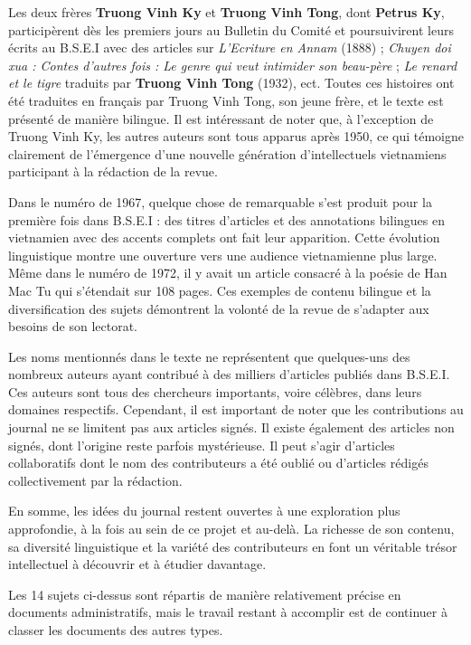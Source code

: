 Les deux frères \textbf{Truong Vinh Ky} et \textbf{Truong Vinh Tong}, dont \textbf{Petrus Ky}, participèrent dès les premiers jours au Bulletin du Comité et poursuivirent leurs écrits au B.S.E.I avec des articles sur \textit{L'Ecriture en Annam} (1888) ; \textit{Chuyen doi xua : Contes d'autres fois : Le genre qui veut intimider son beau-père} ; \textit{Le renard et le tigre} traduits par \textbf{Truong Vinh Tong} (1932), ect.
Toutes ces histoires ont été traduites en français par Truong Vinh Tong, son jeune frère, et le texte est présenté de manière bilingue. Il est intéressant de noter que, à l'exception de Truong Vinh Ky, les autres auteurs sont tous apparus après 1950, ce qui témoigne clairement de l'émergence d'une nouvelle génération d'intellectuels vietnamiens participant à la rédaction de la revue.

Dans le numéro de 1967, quelque chose de remarquable s'est produit pour la première fois dans B.S.E.I : des titres d'articles et des annotations bilingues en vietnamien avec des accents complets ont fait leur apparition. Cette évolution linguistique montre une ouverture vers une audience vietnamienne plus large. Même dans le numéro de 1972, il y avait un article consacré à la poésie de Han Mac Tu qui s'étendait sur 108 pages. Ces exemples de contenu bilingue et la diversification des sujets démontrent la volonté de la revue de s'adapter aux besoins de son lectorat.

Les noms mentionnés dans le texte ne représentent que quelques-uns des nombreux auteurs ayant contribué à des milliers d'articles publiés dans B.S.E.I. Ces auteurs sont tous des chercheurs importants, voire célèbres, dans leurs domaines respectifs. Cependant, il est important de noter que les contributions au journal ne se limitent pas aux articles signés. Il existe également des articles non signés, dont l'origine reste parfois mystérieuse. Il peut s'agir d'articles collaboratifs dont le nom des contributeurs a été oublié ou d'articles rédigés collectivement par la rédaction.

En somme, les idées du journal restent ouvertes à une exploration plus approfondie, à la fois au sein de ce projet et au-delà. La richesse de son contenu, sa diversité linguistique et la variété des contributeurs en font un véritable trésor intellectuel à découvrir et à étudier davantage.


Les 14 sujets ci-dessus sont répartis de manière relativement précise en documents administratifs, mais le travail restant à accomplir est de continuer à classer les documents des autres types.

